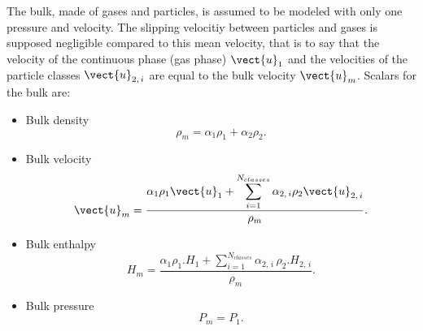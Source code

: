 The bulk, made of gases and particles, is assumed to be modeled with only one pressure and velocity. The slipping velocitiy between particles 
and gases is supposed negligible compared to this mean velocity, that is to say that the velocity of the continuous phase (gas phase) $\vect{u}_1$ and the velocities of the particle classes $\vect{u}_{2, \, i}$ are equal to the bulk velocity $\vect{u}_m$.
Scalars for the bulk are:
\begin{itemize}
  \item Bulk density 
     \begin{equation} 
        \rho_{m} = \alpha_{1}\rho_{1} + \alpha_{2}\rho_{2}.
     \end{equation} 

  \item Bulk velocity 
     \begin{equation} 
       \vect{u}_{m} = \dfrac{ \alpha_{1}\rho_{1} \vect{u}_{1} 
                    + \displaystyle \sum_{i=1}^{N_{classes}}\alpha_{2, \, i}\rho_{2} \vect{u}_{2, \, i} }{\rho_{m}}.
     \end{equation}

  \item Bulk enthalpy 
     \begin{equation} 
        H_{m} = \dfrac{ \alpha_{1}\rho_{1}.H_{1} 
                     + \displaystyle \sum_{i=1}^{N_{classes}}\alpha_{2, \, i} \,\rho_{2}.H_{2, \, i} }{\rho_{m}}.
     \end{equation} 

  \item Bulk pressure 
     \begin{equation} 
       P_{m} = P_{1}.
     \end{equation}
\end{itemize}


